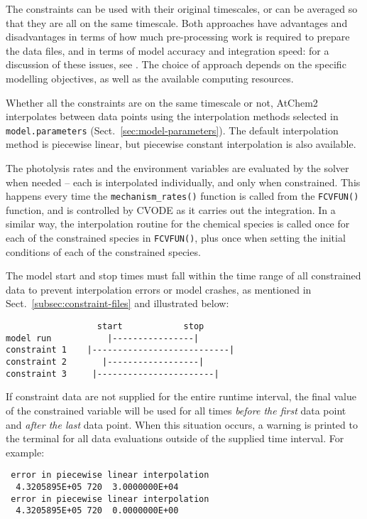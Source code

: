 The constraints can be used with their original timescales, or can be
averaged so that they are all on the same timescale. Both approaches
have advantages and disadvantages in terms of how much pre-processing
work is required to prepare the data files, and in terms of model
accuracy and integration speed: for a discussion of these issues, see
\citet{sommariva_2020}. The choice of approach depends on the specific
modelling objectives, as well as the available computing resources.

Whether all the constraints are on the same timescale or not, AtChem2
interpolates between data points using the interpolation methods
selected in \texttt{model.parameters} (Sect.~\ref{sec:model-parameters}).
The default interpolation method is piecewise linear, but piecewise
constant interpolation is also available.

The photolysis rates and the environment variables are evaluated by the
solver when needed -- each is interpolated individually, and only when
constrained. This happens every time the \texttt{mechanism\_rates()}
function is called from the \texttt{FCVFUN()} function, and is
controlled by CVODE as it carries out the integration. In a similar
way, the interpolation routine for the chemical species is called once
for each of the constrained species in \texttt{FCVFUN()}, plus once
when setting the initial conditions of each of the constrained
species.

The model start and stop times must fall within the time range of all
constrained data to prevent interpolation errors or model crashes, as
mentioned in Sect.~\ref{subsec:constraint-files} and illustrated
below:

\begin{verbatim}
                  start            stop
model run           |----------------|
constraint 1    |---------------------------|
constraint 2       |------------------|
constraint 3     |-----------------------|
\end{verbatim}

If constraint data are not supplied for the entire runtime interval,
the final value of the constrained variable will be used for all times
\emph{before the first} data point and \emph{after the last} data
point. When this situation occurs, a warning is printed to the
terminal for all data evaluations outside of the supplied time
interval. For example:

\begin{verbatim}
 error in piecewise linear interpolation
  4.3205895E+05 720  3.0000000E+04
 error in piecewise linear interpolation
  4.3205895E+05 720  0.0000000E+00
\end{verbatim}

